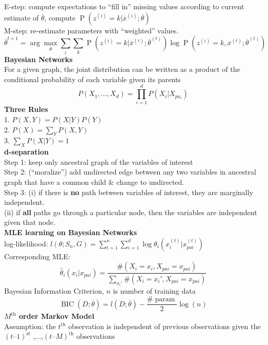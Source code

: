 \documentclass[10pt, letterpaper]{article}
\begin{document}
\begin{multicols*}{2}
E-step: compute expectations to ``fill in'' missing values according to current estimate of $\overline{\theta}$, compute $\operatorname{P}(z^{(i)}=k|\overline{x}^{(i)};\overline{\theta})$\\
M-step: re-estimate parameters with ``weighted'' values.\\
\[\overline{\theta}^{t + 1} = \arg\max_{\overline{\theta}} \sum_{i}\sum_{k} \operatorname{P}(z^{(i)}=k|\overline{x}^{(i)};\overline{\theta}^{(t)})\log \operatorname{P}(z^{(i)} = k, \overline{x}^{(i)}; \overline{\theta}^{(t)})\]
\textbf{Bayesian Networks}\\
For a given graph, the joint distribution can be written as a product of the conditional probability of each variable given its parents
\[P\left(X_{1}, \ldots, X_{d}\right)=\prod_{i=1}^{d} P\left(X_{i} | X_{p a_{i}}\right)\]
\textbf{Three Rules}\\
1. $P(X,Y)=P(X|Y)P(Y)$\\
2. $P(X) = \sum_YP(X,Y)$\\
3. $\sum_XP(X|Y) = 1$\\
\textbf{d-separation}\\
Step 1: keep only ancestral graph of the variables of interest\\
Step 2: (``moralize'') add undirected edge between any two variables in ancestral graph that have a common child \& change to undirected.\\
Step 3: (i) if there is \textbf{no} path between variables of interest, they are marginally independent.\\
(ii) if \textbf{all} paths go through a particular node, then the variables are independent given that node.\\
\textbf{MLE learning on Bayesian Networks}\\
log-likelihood: $l(\theta; S_n, G) = \sum_{t= 1}^n\sum_{i = 1}^d \log \theta_i(x_{i}^{(t)}|x_{pai}^{(t)})$\\
Corresponding MLE:
\vspace*{-1em}
\[\hat{\theta}_i(x_i|x_{pai}) = \frac{\#(X_i=x_i, X_{pai}=x_{pai})}{\sum_{x_i'}\#(X_i=x_i', X_{pai}=x_{pai})}\]
Bayesian Information Criterion, $n$ is number of training data
\vspace*{-1em}
\[\operatorname{BIC}(D;\overline{\theta}) = l(D; \overline{\theta}) - \frac{\#\operatorname{param}}{2}\log(n)\]
\textbf{$M^{\text{th}}$ order Markov Model}\\
Assumption: the $t^{\text{th}}$ observation is independent of previous observations given the $(t – 1)^{\text{st}}$ ,...,$(t – M)^{\text{th}}$ observations\\

\end{multicols*}
\end{document}
